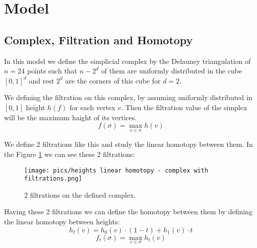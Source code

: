 \documentclass{article}
\begin{document}
\tableofcontents
\newpage

\section{Model}
\subsection{Complex, Filtration and Homotopy}
\par In this model we define the simplicial complex by the Delauney triangulation of $n = 24$ points such that $n - 2^d$ of them  are uniformly distributed in the cube $[0, 1]^d$ and rest $2^d$ are the corners of this cube for $d = 2$.
\par We defining the filtration on this complex, by assuming uniformly distributed in $[0, 1]$ height $h(f)$ for each vertex $v$. Then the filtration value of the simplex will be the maximum haight of its vertices.
$$
    f(\sigma) = \max_{v\in \sigma} h(v)
$$
\par We define 2 filtrations like this and study the linear homotopy between them. In the Figure \ref{fig:complex} we can see these 2 filtrations:
\begin{figure}[h!]
    \centering
    \texttt{[image: pics/heights linear homotopy - complex with filtrations.png]}
    \caption{2 filtrations on the defined complex.}
    \label{fig:complex}
\end{figure}

\par Having these 2 filtrations we can define the homotopy between them by defining the linear homotopy between heights:
$$
    h_t(v) = h_0(v)\cdot(1 - t) + h_1(v)\cdot t
$$
$$
    f_t(\sigma) = \max_{v\in \sigma} h_t(v)
$$
\end{document}
